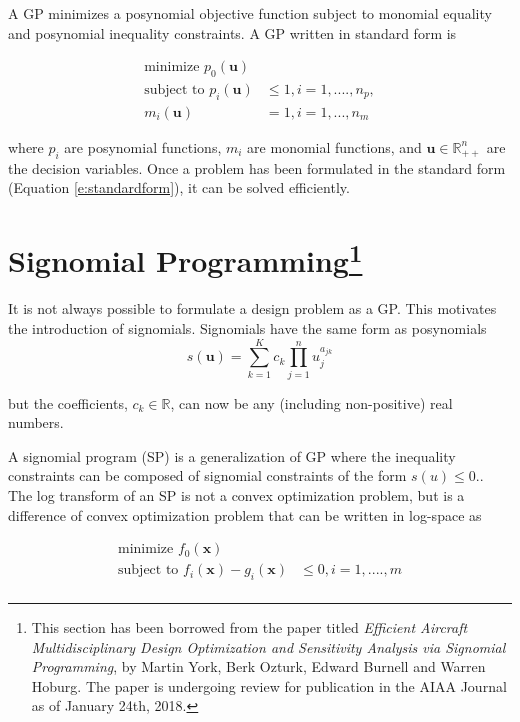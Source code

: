 A GP minimizes a posynomial objective function subject to monomial equality and
posynomial inequality constraints. A GP written in standard form is

\begin{equation}
\label{e:standardform}
\begin{aligned}
\text{minimize }p_{0}(\mathbf{u})& \\
\text{subject to }p_{i}(\mathbf{u})& \leq 1, i = 1, ...., n_{p}, \\
m_{i}(\mathbf{u})& = 1, i = 1, ..., n_{m}
\end{aligned}
\end{equation}

where $p_{i}$ are posynomial functions, $m_{i}$ are monomial functions, and
$\mathbf{u} \in \mathbb{R}^n_{++}$ are the decision variables. Once a problem
has been formulated in the standard form (Equation \ref{e:standardform}), it can
be solved efficiently.

\section[Signomial Programming]{Signomial Programming\footnote{This section has been borrowed from the paper
titled \textit{Efficient Aircraft Multidisciplinary Design Optimization and Sensitivity Analysis via Signomial Programming},
by Martin York, Berk Ozturk, Edward Burnell and Warren Hoburg.
The paper is undergoing review for publication in the AIAA Journal as of January 24th, 2018.}}
\label{a:spintro}

It is not always possible to formulate a design problem as a GP. This motivates
the introduction of signomials. Signomials have the same form as posynomials
\begin{equation}\label{e:signomial}
s(\mathbf{u}) = \sum_{k=1}^{K}c_{k}\prod_{j=1}^{n} u_{j}^{a_{jk}}
\end{equation}

but the coefficients, $c_{k} \in \mathbb{R}$, can now be any (including
non-positive) real numbers.

A signomial program (SP) is a generalization of GP where the inequality
constraints can be composed of signomial constraints of the form $s(u) \leq 0$..
The log transform of an SP is not a convex optimization problem, but is a
difference of convex optimization problem that can be written in log-space as

\begin{equation}
\begin{aligned}
\text{minimize }f_{0}(\mathbf{x})& \\
\text{subject to }f_{i}(\mathbf{x}) -  g_{i}(\mathbf{x})& \leq 0, i = 1, ...., m
\\
\end{aligned}
\end{equation}


